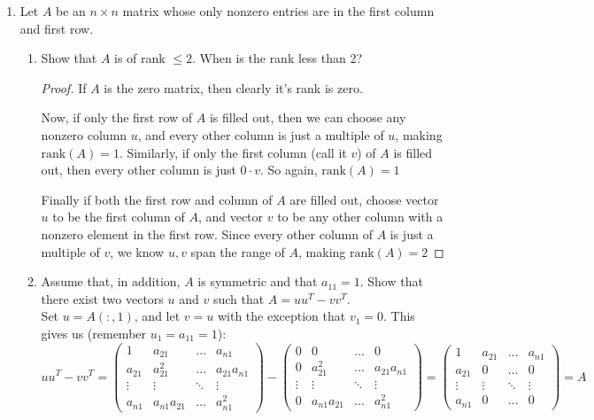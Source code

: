 \documentclass[11pt]{article}
\newcommand{\n}{\vspace{0.2cm}}
\begin{document}
\begin{enumerate}
	\item Let \(A\) be an \(n \times n\) matrix whose only nonzero entries are in the first column and first row.
	      \begin{enumerate}[label=(\alph*)]
		      \item Show that \(A\) is of rank \(\leq 2\).  When is the rank less than 2?
		            \begin{proof}
			            If \(A\) is the zero matrix, then clearly it's rank is zero. \n

			            Now, if only the first row of \(A\) is filled out, then we can choose any nonzero column \(u\), and every other column is just a multiple of \(u\), making \(\text{rank}(A) = 1\).  Similarly, if only the first column (call it \(v\)) of \(A\) is filled out, then every other column is just \(0 \cdot v\).  So again, \(\text{rank}(A) = 1\) \n

			            Finally if both the first row and column of \(A\) are filled out, choose vector \(u\) to be the first column of \(A\), and vector \(v\) to be any other column with a nonzero element in the first row.  Since every other column of \(A\) is just a multiple of \(v\), we know \(u,v\) span the range of \(A\), making \(\text{rank}(A) = 2\)\n
		            \end{proof}


		      \item Assume that, in addition, \(A\) is symmetric and that \(a_{11} = 1\).  Show that there exist two vectors \(u\) and \(v\) such that \(A = uu^T - vv^T\). \n\\
		            Set \(u = A(:,1)\), and let \(v = u\) with the exception that \(v_1 = 0\).  This gives us (remember \(u_1 = a_{11} = 1\)):
		            \[uu^T - vv^T =
			            \begin{pmatrix} 1 & a_{21} & \hdots & a_{n1} \\ a_{21} & a_{21}^2 & \hdots & a_{21}a_{n1}  \\ \vdots & \vdots & \ddots & \vdots \\ a_{n1} & a_{n1}a_{21} & \hdots & a_{n1}^2
			            \end{pmatrix} -
			            \begin{pmatrix} 0 & 0 & \hdots & 0 \\ 0 & a_{21}^2 & \hdots & a_{21}a_{n1}  \\ \vdots & \vdots & \ddots & \vdots \\ 0 & a_{n1}a_{21} & \hdots & a_{n1}^2
			            \end{pmatrix} =
			            \begin{pmatrix} 1 & a_{21} & \hdots & a_{n1} \\ a_{21} & 0 & \hdots & 0 \\ \vdots & \vdots & \ddots & \vdots \\ a_{n1} & 0 & \hdots & 0
			            \end{pmatrix} = A
		            \]
	      \end{enumerate}


\end{enumerate}
\end{document}
